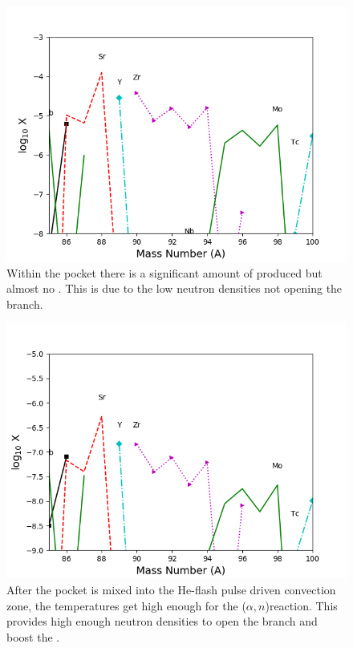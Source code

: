 \documentclass[fleqn,usenatbib]{mnras}
\begin{document}
\begin{figure}
  \includegraphics[width=\columnwidth]{figs/C13_Zr.png}
  \caption{Within the \carbon[13] pocket there is a significant amount of \zirconium[94] produced but almost no \zirconium[96]. This is due to the low neutron densities not opening the \zirconium[95] branch.} 
\end{figure}

\begin{figure}
  \includegraphics[width=\columnwidth]{figs/Pulse_Zr.png}
  \caption{After the \carbon[13] pocket is mixed into the He-flash pulse driven convection zone, the temperatures get high enough for the \neon[22]($\alpha,n$)\magnesium[25] reaction. This provides high enough neutron densities to open the \zirconium[95] branch and boost the \zirconium[96].} 
\end{figure}
\end{document}
